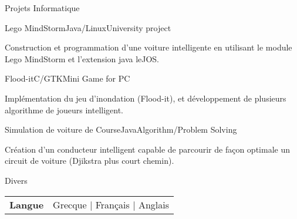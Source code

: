 \documentclass{resume} %
\begin{document}
\begin{rSection}{Projets Informatique}
\begin{rSubsection}{Lego MindStorm}{Java/Linux}{University project }{}
	\item Construction et programmation d'une voiture intelligente en utilisant le module Lego MindStorm et l'extension java leJOS.
\end{rSubsection}


\begin{rSubsection}{Flood-it}{C/GTK}{Mini Game for PC}{}
	\item Implémentation du jeu d'inondation (Flood-it), et développement de plusieurs algorithme de joueurs intelligent.
\end{rSubsection}

\begin{rSubsection}{Simulation de voiture de Course}{Java}{Algorithm/Problem Solving}{}
	\item Création d'un conducteur intelligent capable de parcourir de façon optimale un circuit de voiture (Djikstra plus court chemin).
\end{rSubsection}

\end{rSection}

\begin{rSection}{Divers}

	\begin{tabular}{ @{} >{\bfseries}l @{\hspace{6ex}} l }
		Langue & Grecque | Français | Anglais  \\
	\end{tabular}
	
\end{rSection}
\end{document}
